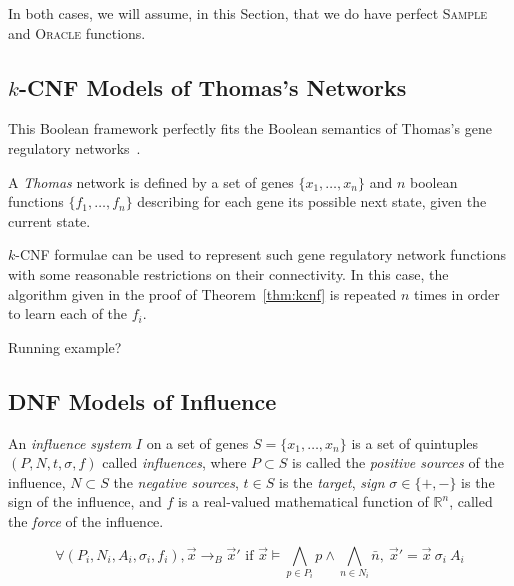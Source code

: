 \documentclass{llncs}
\newcommand{\lra}{\longrightarrow}
\begin{document}
In both cases, we will assume, in this Section, that we do have perfect
\textsc{Sample} and \textsc{Oracle} functions.

\subsection{$k$-CNF Models of Thomas's Networks}

This Boolean framework perfectly fits the Boolean semantics of Thomas's gene
regulatory networks~\cite{GK73jtb,Thomas73jtb,TA90book}.

\begin{definition}
   A \emph{Thomas} network is defined by a set of genes $\{x_1,\dots,x_n\}$
   and $n$ boolean functions $\{f_1,\dots,f_n\}$ describing for each gene its
   possible next state, given the current state.
\end{definition}



$k$-CNF formulae can be used to represent such gene regulatory network functions with some reasonable restrictions on their connectivity.
In this case, the algorithm given in the proof of Theorem~\ref{thm:kcnf} is repeated $n$ times in order to learn each of the $f_i$.

\begin{example}
   Running example?
\end{example}



\subsection{DNF Models of Influence}

\begin{definition}

   An \emph{influence system} $I$ on a set of genes $S=\{x_1,\dots,x_n\}$ is a
   set of quintuples $(P, N, t, \sigma, f)$ called \emph{influences}, where
   $P\subset S$ is called the \emph{positive sources} of the influence,
   $N\subset S$ the \emph{negative sources}, $t\in S$ is the \emph{target},
   \emph{sign} $\sigma\in\{+,-\}$ is the sign of the influence, and $f$ is a
   real-valued mathematical function of $\mathbb{R}^n$, called the
   \emph{force} of the influence.

\end{definition}

\begin{definition}
$$\forall (P_i, N_i, A_i, \sigma_i, f_i),
{\vec x}\lra_B{\vec x'}\text{ if }{\vec x}\models \bigwedge_{p\in
P_i}p\wedge\bigwedge_{n\in N_i}\bar{n},\ {\vec x'} = {\vec x}\ \sigma_i\ A_i$$
\end{definition}
\end{document}
